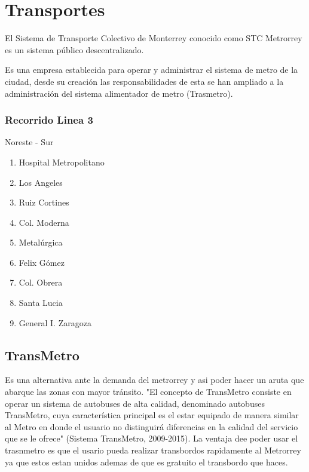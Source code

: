 \documentclass[a4paper]{article}
\begin{document}
\autocite{Poblacion}

\section{Transportes}
El Sistema de Transporte Colectivo de Monterrey conocido como STC Metrorrey es un sistema público descentralizado.

Es una empresa establecida para operar y administrar el sistema de metro de la ciudad, desde su creación  las responsabilidades de esta se han ampliado a la administración del sistema alimentador de metro (Trasmetro).

\autocite{Manchester}


\subsubsection{Recorrido Linea 3}
Noreste - Sur
\begin{enumerate}
\item Hospital Metropolitano
\item Los Angeles
\item Ruiz Cortines
\item Col. Moderna
\item Metalúrgica
\item Felix Gómez
\item Col. Obrera
\item Santa Lucia
\item General I. Zaragoza
\end{enumerate}

\autocite{LineasMetro}

\subsection{TransMetro}
Es una alternativa ante la demanda del metrorrey y asi poder hacer un aruta que abarque las zonas con mayor tránsito. "El concepto de TransMetro consiste en operar un sistema de autobuses de alta calidad, denominado autobuses TransMetro, cuya característica principal es el estar equipado de manera similar al Metro en donde el usuario no distinguirá diferencias en la calidad del servicio que se le ofrece" (Sistema TransMetro, 2009-2015). La ventaja dee poder usar el trasnmetro es que el usario pueda realizar transbordos rapidamente al Metrorrey ya que estos estan unidos ademas de que es gratuito el transbordo que haces.

\autocite{TEC1}
\end{document}

